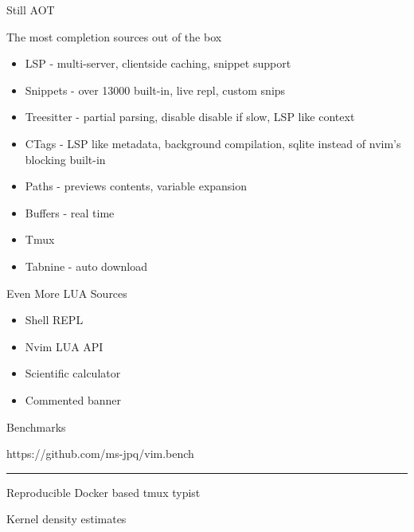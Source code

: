 \documentclass{beamer}
\begin{document}
\begin{frame}{Still AOT}

	The most completion sources out of the box

	\begin{itemize}

		\item LSP - multi-server, clientside caching, snippet support

		\item Snippets - over 13000 built-in, live repl, custom snips

		\item Treesitter - partial parsing, disable disable if slow, LSP like context

		\item CTags - LSP like metadata, background compilation, sqlite instead of nvim's blocking built-in

		\item Paths - previews contents, variable expansion

		\item Buffers - real time

		\item Tmux

		\item Tabnine - auto download

	\end{itemize}

\end{frame}


\begin{frame}{Even More LUA Sources}

	\begin{itemize}

		\item Shell REPL

		\item Nvim LUA API

		\item Scientific calculator

		\item Commented banner

	\end{itemize}

\end{frame}


\begin{frame}{Benchmarks}

	https://github.com/ms-jpq/vim.bench

	\rule{\textwidth}{0.1em}

	Reproducible Docker based tmux typist

	Kernel density estimates

\end{frame}
\end{document}
